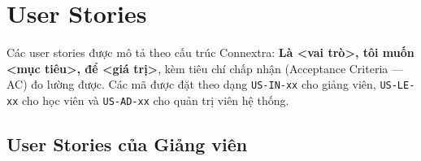 \section{User Stories}
\label{sec:user-stories}

Các user stories được mô tả theo cấu trúc Connextra: \textbf{Là \textless vai
trò\textgreater, tôi muốn \textless mục tiêu\textgreater, để \textless giá
trị\textgreater}, kèm tiêu chí chấp nhận (Acceptance Criteria --- AC) đo lường
được. Các mã được đặt theo dạng \texttt{US-IN-xx} cho giảng viên,
\texttt{US-LE-xx} cho học viên và \texttt{US-AD-xx} cho quản trị viên hệ
thống.

\subsection{User Stories của Giảng viên}

